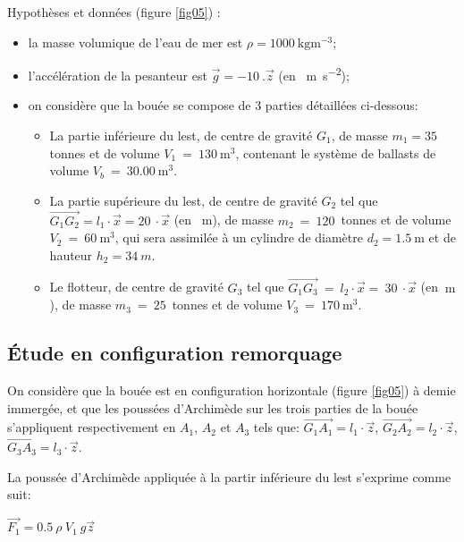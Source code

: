Hypothèses et données (figure \ref{fig05}) :
\begin{itemize}
 \item la masse volumique de l'eau de mer est $\rho=\SI{1000}{\kg \m^{-3}}$;
 \item l'accélération de la pesanteur est $\vec{g} = \SI{-10}{}.\vec{z}$ (en \SI{}{\m \s^{-2}});
 \item on considère que la bouée se compose de 3
parties détaillées ci-dessous:
\begin{itemize}
\item La partie inférieure du lest, de centre de
gravité $G_1$, de masse $m_1=\num{35}$ tonnes et de volume $V_1~=~\SI{130}{\m^3}$, contenant le système de ballasts de volume $V_b~=~\SI{30,00}{\m^3}$.
\item La partie supérieure du lest, de centre de gravité $G_2$ tel que $\overrightarrow{G_1G_2}= l_1\cdot \vec{x}= \SI{20}{}\cdot \vec{x}$ (en \SI{}{\m}), de masse $m_2~=~\num{120}$~tonnes et de volume $V_2~=~\SI{60}{\m^3}$, qui sera assimilée à un cylindre de diamètre $d_2=\SI{1,5}{\m}$ et de hauteur $h_2=\SI{34}{m}$.
\item Le flotteur, de centre de gravité $G_3$ tel que $\overrightarrow{G_1G_3}~=~l_2\cdot \vec{x}=~\SI{30}{}\cdot\vec{x}$ (en $\SI{}{\m}$), de masse $m_3~=~\num{25}$~tonnes et de volume $V_3~=~\SI{170}{\m^3}$.
\end{itemize}
\end{itemize}

\subsection{Étude en configuration remorquage}

On considère que la bouée est en configuration horizontale (figure \ref{fig05}) à demie immergée, et que les poussées d'Archimède sur les trois parties de la bouée s'appliquent respectivement en $A_1$, $A_2$ et $A_3$ tels que: $\overrightarrow{G_1A_1}=l_1\cdot\vec{z}$,
$\overrightarrow{G_2A_2}=l_2\cdot\vec{z}$,
$\overrightarrow{G_3A_3}=l_3\cdot\vec{z}$.

La poussée d'Archimède appliquée à la partir inférieure du lest s'exprime comme suit:
\begin{center}
$\overrightarrow{F_1}=0.5~\rho~V_1~g\overrightarrow{z}$
\end{center}



